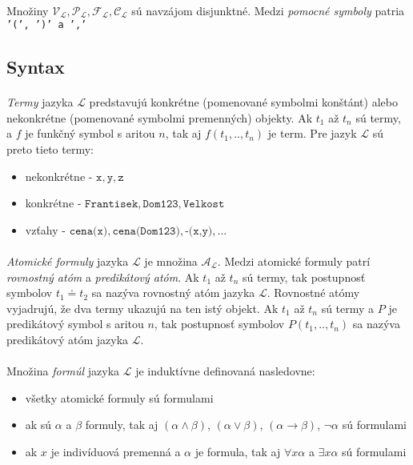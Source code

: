 \paragraph{}
Množiny $\mathcal{V}_\mathcal{L}, \mathcal{P}_\mathcal{L}, \mathcal{F}_\mathcal{L}, \mathcal{C}_\mathcal{L}$ sú navzájom disjunktné. Medzi \emph{pomocné symboly} patria \texttt{'(', ')' a ','}



\subsection{Syntax}

\paragraph{}
\emph{Termy} jazyka $\mathcal{L}$ predstavujú konkrétne (pomenované symbolmi konštánt) alebo nekonkrétne (pomenované symbolmi premenných) objekty. Ak $t_1$ až $t_n$ sú termy, a $f$ je funkčný symbol s aritou $n$, tak aj $f(t_1, .., t_n)$ je term. Pre jazyk $\mathcal{L}$ sú preto tieto termy:
\begin{itemize}
	\item nekonkrétne - $\texttt{x}, \texttt{y}, \texttt{z}$
	\item konkrétne - $\texttt{Frantisek}, \texttt{Dom123}, \texttt{Velkost}$
	\item vzťahy - $\texttt{cena(x)}, \texttt{cena(Dom123)}, \texttt{-(x,y)}, ...$
\end{itemize}

\paragraph{}
\emph{Atomické formuly} jazyka $\mathcal{L}$ je množina $\mathcal{A}_\mathcal{L}$. Medzi atomické formuly patrí \emph{rovnostný atóm} a \emph{predikátový atóm}. Ak $t_1$ až $t_n$ sú termy, tak postupnosť symbolov $t_1 \doteq t_2$ sa nazýva rovnostný atóm jazyka $\mathcal{L}$. Rovnostné atómy vyjadrujú, že dva termy ukazujú na ten istý objekt. Ak $t_1$ až $t_n$ sú termy a $P$ je predikátový symbol s aritou $n$, tak postupnosť symbolov $P(t_1, ..,  t_n)$ sa nazýva predikátový atóm jazyka $\mathcal{L}$. 

\paragraph{}
Množina \emph{formúl} jazyka $\mathcal{L}$ je induktívne definovaná nasledovne:
\begin{itemize}
    \item všetky atomické formuly sú formulami
    \item ak sú $\alpha$ a $\beta$ formuly, tak aj $(\alpha \wedge \beta)$, $(\alpha \vee \beta)$, $(\alpha \to \beta)$, $\neg \alpha$ sú formulami
    \item ak $x$ je indivíduová premenná a $\alpha$ je formula, tak aj $\forall x \alpha$ a $\exists x \alpha$ sú formulami
\end{itemize}


